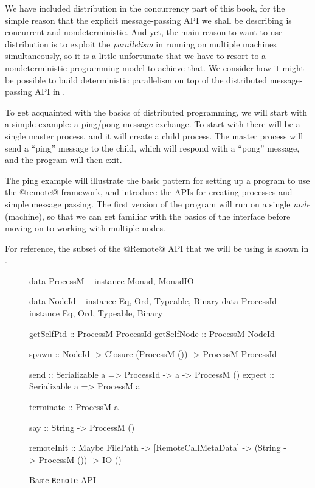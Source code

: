 
We have included distribution in the concurrency part of this book,
for the simple reason that the explicit message-passing API we shall
be describing is concurrent and nondeterministic.  And yet, the main
reason to want to use distribution is to exploit the
\emph{parallelism} in running on multiple machines simultaneously, so
it is a little unfortunate that we have to resort to a
nondeterministic programming model to achieve that.  We consider how
it might be possible to build deterministic parallelism on top of
the distributed message-passing API in .


To get acquainted with the basics of distributed programming, we will
start with a simple example: a ping/pong message exchange.  To start
with there will be a single master process, and it will create a child
process.  The master process will send a ``ping'' message to the
child, which will respond with a ``pong'' message, and the program
will then exit.

The ping example will illustrate the basic pattern for setting up a
program to use the @remote@ framework, and introduce the APIs for
creating processes and simple message passing.  The first version of
the program will run on a single \emph{node} (machine), so that we can
get familiar with the basics of the interface before moving on to
working with multiple nodes.

For reference, the subset of the @Remote@ API that we will be using is
shown in .

\begin{figure}
\begin{haskell}
data ProcessM  -- instance Monad, MonadIO

data NodeId    -- instance Eq, Ord, Typeable, Binary
data ProcessId -- instance Eq, Ord, Typeable, Binary

getSelfPid  :: ProcessM ProcessId
getSelfNode :: ProcessM NodeId

spawn  :: NodeId -> Closure (ProcessM ()) -> ProcessM ProcessId

send   :: Serializable a => ProcessId -> a -> ProcessM ()
expect :: Serializable a => ProcessM a

terminate :: ProcessM a

say :: String -> ProcessM ()

remoteInit :: Maybe FilePath
           -> [RemoteCallMetaData]
           -> (String -> ProcessM ())
           -> IO ()
\end{haskell}
\label{fig:basic-remote}
\caption{Basic \texttt{Remote} API}
\end{figure}

